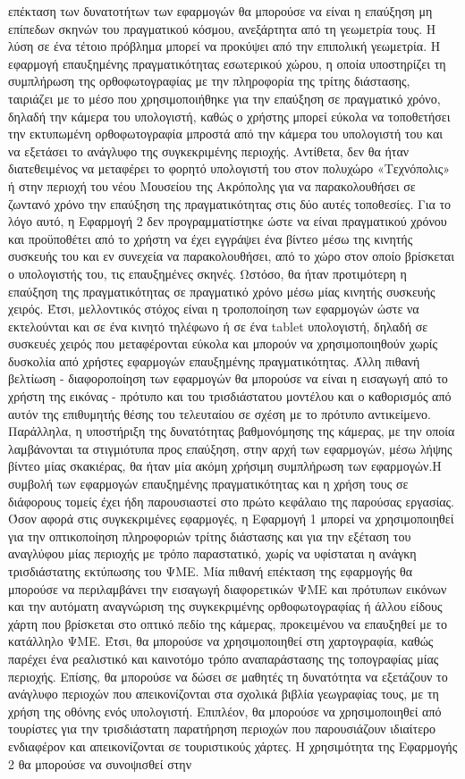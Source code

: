 επέκταση των δυνατοτήτων των εφαρμογών θα μπορούσε να είναι η επαύξηση μη επίπεδων σκηνών του πραγματικού κόσμου, ανεξάρτητα από τη γεωμετρία τους. Η λύση σε ένα τέτοιο πρόβλημα μπορεί να προκύψει από την επιπολική γεωμετρία. Η εφαρμογή επαυξημένης πραγματικότητας εσωτερικού χώρου, η οποία υποστηρίζει τη συμπλήρωση της ορθοφωτογραφίας με την πληροφορία της τρίτης διάστασης, ταιριάζει με το μέσο που χρησιμοποιήθηκε για την επαύξηση σε πραγματικό χρόνο, δηλαδή την κάμερα του υπολογιστή, καθώς ο χρήστης μπορεί εύκολα να τοποθετήσει την εκτυπωμένη ορθοφωτογραφία μπροστά από την κάμερα του υπολογιστή του και να εξετάσει το ανάγλυφο της συγκεκριμένης περιοχής. Αντίθετα, δεν θα ήταν διατεθειμένος να μεταφέρει το φορητό υπολογιστή του στον πολυχώρο «Τεχνόπολις» ή στην περιοχή του νέου Μουσείου της Ακρόπολης για να παρακολουθήσει σε ζωντανό χρόνο την επαύξηση της πραγματικότητας στις δύο αυτές τοποθεσίες. Για το λόγο αυτό, η Εφαρμογή 2 δεν προγραμματίστηκε ώστε να είναι πραγματικού χρόνου και προϋποθέτει από το χρήστη να έχει εγγράψει ένα βίντεο μέσω της κινητής συσκευής του και εν συνεχεία να παρακολουθήσει, από το χώρο στον οποίο βρίσκεται ο υπολογιστής του, τις επαυξημένες σκηνές. Ωστόσο, θα ήταν προτιμότερη η επαύξηση της πραγματικότητας σε πραγματικό χρόνο μέσω μίας κινητής συσκευής χειρός. Έτσι, μελλοντικός στόχος είναι η τροποποίηση των εφαρμογών ώστε να εκτελούνται και σε ένα κινητό τηλέφωνο ή σε ένα tablet υπολογιστή, δηλαδή σε συσκευές χειρός που μεταφέρονται εύκολα και μπορούν να χρησιμοποιηθούν χωρίς δυσκολία από χρήστες εφαρμογών επαυξημένης πραγματικότητας. Άλλη πιθανή βελτίωση - διαφοροποίηση των εφαρμογών θα μπορούσε να είναι η εισαγωγή από το χρήστη της εικόνας - πρότυπο και του τρισδιάστατου μοντέλου και ο καθορισμός από αυτόν της επιθυμητής θέσης του τελευταίου σε σχέση με το πρότυπο αντικείμενο. Παράλληλα, η υποστήριξη της δυνατότητας βαθμονόμησης της κάμερας, με την οποία λαμβάνονται τα στιγμιότυπα προς επαύξηση, στην αρχή των εφαρμογών, μέσω λήψης βίντεο μίας σκακιέρας, θα ήταν μία ακόμη χρήσιμη συμπλήρωση των εφαρμογών.Η συμβολή των εφαρμογών επαυξημένης πραγματικότητας και η χρήση τους σε διάφορους τομείς έχει ήδη παρουσιαστεί στο πρώτο κεφάλαιο της παρούσας εργασίας. Όσον αφορά στις συγκεκριμένες εφαρμογές, η Εφαρμογή 1 μπορεί να χρησιμοποιηθεί για την οπτικοποίηση πληροφοριών τρίτης διάστασης και για την εξέταση του αναγλύφου μίας περιοχής με τρόπο παραστατικό, χωρίς να υφίσταται η ανάγκη τρισδιάστατης εκτύπωσης του ΨΜΕ. Μία πιθανή επέκταση της εφαρμογής θα μπορούσε να περιλαμβάνει την εισαγωγή διαφορετικών ΨΜΕ και πρότυπων εικόνων και την αυτόματη αναγνώριση της συγκεκριμένης ορθοφωτογραφίας ή άλλου είδους χάρτη που βρίσκεται στο οπτικό πεδίο της κάμερας, προκειμένου να επαυξηθεί με το κατάλληλο ΨΜΕ. Έτσι, θα μπορούσε να χρησιμοποιηθεί στη χαρτογραφία, καθώς παρέχει ένα ρεαλιστικό και καινοτόμο τρόπο αναπαράστασης της τοπογραφίας μίας περιοχής. Επίσης, θα μπορούσε να δώσει σε μαθητές τη δυνατότητα να εξετάζουν το ανάγλυφο περιοχών που απεικονίζονται στα σχολικά βιβλία γεωγραφίας τους, με τη χρήση της οθόνης ενός υπολογιστή. Επιπλέον, θα μπορούσε να χρησιμοποιηθεί από τουρίστες για την τρισδιάστατη παρατήρηση περιοχών που παρουσιάζουν ιδιαίτερο ενδιαφέρον και απεικονίζονται σε τουριστικούς χάρτες. Η χρησιμότητα της Εφαρμογής 2 θα μπορούσε να συνοψισθεί στην 
